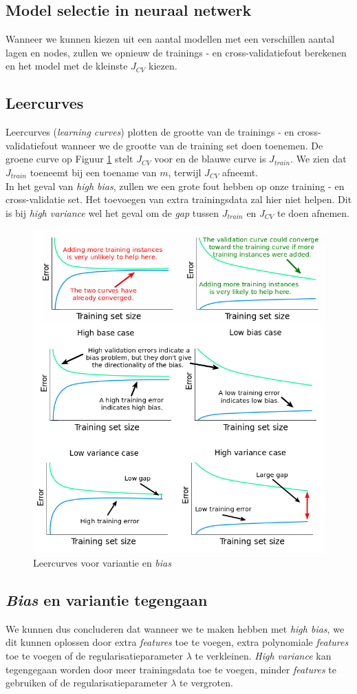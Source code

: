 \subsection{Model selectie in neuraal netwerk}

Wanneer we kunnen kiezen uit een aantal  modellen met een verschillen aantal lagen en nodes, zullen we opnieuw de trainings - en cross-validatiefout berekenen en het model met de kleinste $J_{CV}$ kiezen. 

\subsection{Leercurves}

Leercurves (\textit{learning curves}) plotten de grootte van de trainings - en cross-validatiefout wanneer we de grootte van de training set doen toenemen. De groene curve op Figuur \ref{fig:learning-curves} stelt $J_{CV}$ voor en de blauwe curve is $J_{train}$. We zien dat $J_{train}$ toeneemt bij een toename van $m$, terwijl $J_{CV}$ afneemt. \\
\newline
In het geval van \textit{high bias}, zullen we een grote fout hebben op onze training - en cross-validatie set. Het toevoegen van extra trainingsdata zal hier niet helpen. Dit is bij \textit{high variance} wel het geval om de \textit{gap} tussen $J_{train}$ en $J_{CV}$ te doen afnemen.

\begin{figure}[h]
	\centering
	\includegraphics[width=0.65\linewidth]{images/20-learning-curves.png}
	\caption{Leercurves voor variantie en \textit{bias}}
	\label{fig:learning-curves}
\end{figure}

\subsection{\textit{Bias} en variantie tegengaan}

We kunnen dus concluderen dat wanneer we te maken hebben met \textit{high bias}, we dit kunnen oplossen door extra \textit{features} toe te voegen, extra polynomiale \textit{features} toe te voegen of de regularisatieparameter $\lambda$ te verkleinen. \textit{High variance} kan tegengegaan worden door meer trainingsdata toe te voegen, minder \textit{features} te gebruiken of de regularisatieparameter $\lambda$ te vergroten.